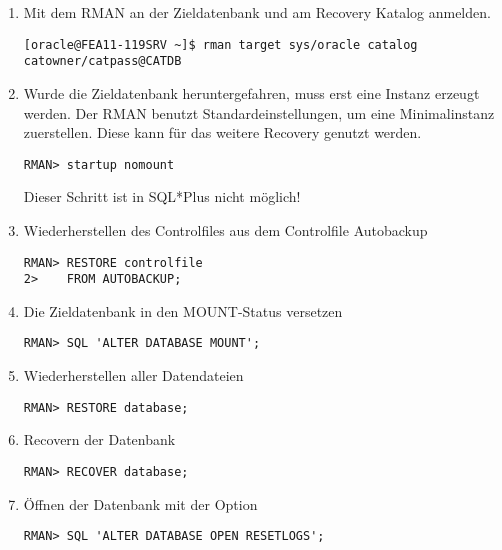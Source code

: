           \begin{enumerate}
            \item Mit dem RMAN an der Zieldatenbank und am Recovery Katalog anmelden.
              \begin{lstlisting}[caption={An der Zieldatenbank und am Recovery Katalog anmelden},label=admin1502,language=rman]
[oracle@FEA11-119SRV ~]$ rman target sys/oracle catalog catowner/catpass@CATDB
              \end{lstlisting}
            \item Wurde die Zieldatenbank heruntergefahren, muss erst eine Instanz erzeugt werden. Der RMAN benutzt Standardeinstellungen, um eine Minimalinstanz zuerstellen. Diese kann f\"ur das weitere Recovery genutzt werden.
              \begin{lstlisting}[caption={Zieldatenbank im RMAN in den NOMOUNT-Status bringen},label=admin1503,language=rman,alsolanguage=sqlplus]
RMAN> startup nomount
              \end{lstlisting}
              \begin{merke}
                Dieser Schritt ist in SQL*Plus nicht m\"oglich!
              \end{merke}
            \item Wiederherstellen des Controlfiles aus dem Controlfile Autobackup
              \begin{lstlisting}[caption={Wiederherstellen des Controlfiles},label=admin1504,language=rman]
RMAN> RESTORE controlfile
2>    FROM AUTOBACKUP;
              \end{lstlisting}
            \item Die Zieldatenbank in den MOUNT-Status versetzen
              \begin{lstlisting}[caption={Zieldatenbank mounten},label=admin1505,language=rman,emph={[9]ALTER,DATABASE,MOUNT},emphstyle={[9]\color{magenta}\bfseries}]
RMAN> SQL 'ALTER DATABASE MOUNT';
              \end{lstlisting}
            \item Wiederherstellen aller Datendateien
              \begin{lstlisting}[caption={Datendateien wiederherstellen},label=admin1506,language=rman]
RMAN> RESTORE database;
              \end{lstlisting}
            \item Recovern der Datenbank
              \begin{lstlisting}[caption={Recovern der Datenbank},label=admin1507,language=rman]
RMAN> RECOVER database;
              \end{lstlisting}
            \item \"Offnen der Datenbank mit der Option 
              \begin{lstlisting}[caption={Datenbank mit open resetlogs \"offnen},label=admin1508,language=rman,emph={[9]ALTER,DATABASE,OPEN,RESETLOGS},emphstyle={[9]\color{magenta}\bfseries}]
RMAN> SQL 'ALTER DATABASE OPEN RESETLOGS';
              \end{lstlisting}
            \end{enumerate}
